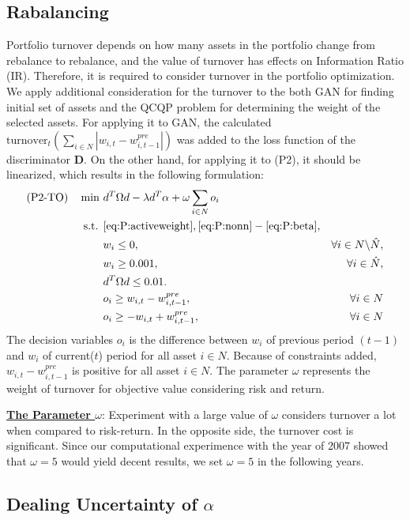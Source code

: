 \documentclass[11pt]{article}
\begin{document}
\subsection{Rabalancing}
	
	Portfolio turnover depends on how many assets in the portfolio change from rebalance to rebalance, and the value of turnover has effects on Information Ratio (IR). Therefore, it is required to consider turnover in the portfolio optimization. We apply additional consideration for the turnover to the both GAN for finding initial  set of assets and the QCQP problem for determining the weight of the selected assets. For applying it to GAN, the calculated $\text{turnover}_{t} (\sum_{i \in N}|w_{i,t}-w_{i,t-1}^{pre}|)$ was added to the loss function of the discriminator \textbf{D}. On the other hand, for applying it to (P2), it should be linearized, which results in the following formulation:
	\begin{align*}
	\text{(P2-TO)} \quad \min~ & d^T\Omega d  -  \lambda d^{T}\alpha + \omega \sum_{i \in N}o_i \\
	\text{s.t. } 
	& \eqref{eq:P:activeweight}, \eqref{eq:P:nonn} - \eqref{eq:P:beta}, \notag\\
	& w_i \le 0, & \forall i \in N \backslash \hat{N}, \\
	& w_i \geq 0.001, & \forall i \in \hat{N}, \\
	& d^T \Omega d \leq 0.01. \\
	& o_i \geq w_{i,t}-w_{i,t-1}^{pre}, & \forall{i \in N} \\
	& o_i \geq -w_{i,t}+w_{i,t-1}^{pre}, & \forall{i \in N} 
	\end{align*} 
	The decision variables $o_i$ is the difference between $w_i$ of previous period $(t-1)$ and $w_i$ of current($t$) period for all asset $i \in N$. Because of constraints added, $ w_{i,t}-w_{i,t-1}^{pre}$ is positive for all asset $i \in N$. The parameter $\omega$ represents the weight of turnover for objective value considering risk and return. 
	
    \underline{\textbf{The Parameter $ \omega$}}: Experiment with a large value of $ \omega $ considers turnover a lot when compared to risk-return. In the opposite side, the turnover cost is significant. Since our computational experimence with the year of 2007 showed that $\omega=5$ would yield decent results, we set $\omega=5$ in the following years.
    
    
	

	\subsection{Dealing Uncertainty of $\alpha$} 
	
\end{document}
